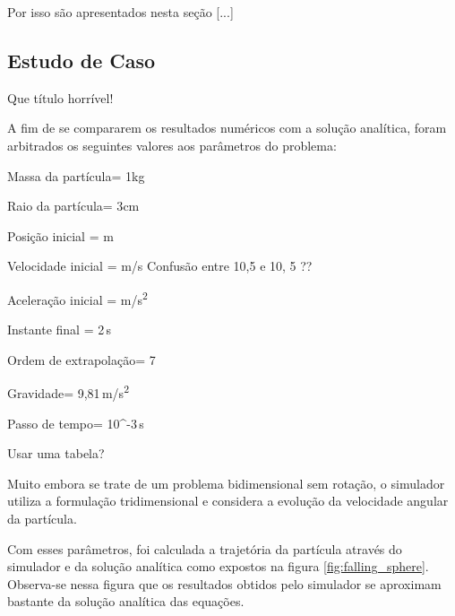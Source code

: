 \alert{Por isso são apresentados nesta seção [...]}

\subsection{Estudo de Caso} \alert{Que título horrível!}

A fim de se compararem os resultados numéricos com a solução analítica, foram arbitrados os seguintes valores aos parâmetros do problema:
\begin{parametersdesc}
	\item{Massa da partícula}{\mass = 1}{\si\kilogram}
	\item{Raio da partícula}{\radius = 3}{\si\centi\metre}
	\item{Posição inicial}{\explicitVector{\initial{\positionx}}{\initial{\positiony}}{\initial{\positionz}} = }{\si{\metre}}
	\item{Velocidade inicial}{\explicitVector{\initial{\velocityx}}{\initial{\velocityy}}{\initial{\velocityz}} = }{\si[per-mode=symbol]{\metre\per\second}}
	\alert{Confusão entre 10,5 e 10, 5 ??}
	\item{Aceleração inicial}{\explicitVector{\initial{\accelerationx}}{\initial{\accelerationy}}{\initial{\accelerationz}} = }{\si[per-mode=symbol]{\metre\per\square\second}}
	\item{Instante final}{ = 2\,}{\si\second} 
	\item{Ordem de extrapolação}{\taylorOrder = 7}{}
	\item{Gravidade}{\gravityScalar = 9,81\,}{\si[per-mode=symbol]{\metre\per\square\second}}
	\item{Passo de tempo}{\Dt = 10^{-3}\,}{\si\second}
\end{parametersdesc} 

\alert{Usar uma tabela?}

Muito embora se trate de um problema bidimensional sem rotação, o simulador utiliza a formulação tridimensional e considera a evolução da velocidade angular da partícula.

Com esses parâmetros, foi calculada a trajetória da partícula através do simulador e da solução analítica como expostos na figura \ref{fig:falling_sphere}. Observa-se nessa figura que os resultados obtidos pelo simulador se aproximam bastante da solução analítica das equações.

